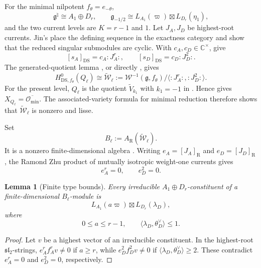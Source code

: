 \documentclass[11pt]{amsart}
\newtheorem{lemma}[theorem]{Lemma}
\theoremstyle{remark}
\numberwithin{equation}{section}
\begin{document}
For the minimal nilpotent \(f_\theta=e_{-\theta}\),
\[
   \mathfrak g^\natural\cong A_1\oplus D_r,
   \qquad
   \mathfrak g_{-1/2}
   \cong L_{A_1}(\varpi)\boxtimes L_{D_r}(\eta_1),
\]
and the two current levels are \(K=r-1\) and \(1\).  Let \(J_A,J_D\)
be highest-root currents.  Jin's \cite[Lemma~3.7 and Equation~(37)]{Jin2026}
place the defining sequence in the exactness category and show that the reduced
singular submodules are cyclic.  With \(c_A,c_D\in\mathbb C^\times\),
\cite[Lemma~3.3 and Proposition~3.6]{Jin2026} give
\[
   [s_A]_{\mathrm{DS}}=c_A:J_A^r:,
   \qquad
   [s_D]_{\mathrm{DS}}=c_D:J_D^2:.
\]
The generated-quotient lemma \cite[Proposition~2.3]{Jin2026}, or directly
\cite[Proposition~3.8]{Jin2026}, gives
\begin{equation}
\label{eq:exact-DS-Q}
   H^0_{\mathrm{DS},f_\theta}(Q_\ell)
   \cong
   \widetilde{\mathcal W}_\ell
   :=\mathcal W^{-1}(\mathfrak g,f_\theta)/
     \langle:J_A^r:,:J_D^2:\rangle.
\end{equation}
For the present level, \(Q_\ell\) is the quotient \(\widetilde V_{k_1}\)
with \(k_1=-1\) in \cite[Section~5]{ArakawaMoreau2018}.  Hence
\cite[Proposition~5.2]{ArakawaMoreau2018} gives
\(X_{Q_\ell}=\overline{\mathcal O_{\min}}\).  The associated-variety
formula for minimal reduction therefore shows that
\(\widetilde{\mathcal W}_\ell\) is nonzero and lisse.

Set
\[
   B_\ell:=A_{\mathrm R}(\widetilde{\mathcal W}_\ell).
\]
It is a nonzero finite-dimensional algebra
\cite[Section~3.3.1]{Jin2026}.  Writing
\(e_A=[J_A]_{\mathrm R}\) and \(e_D=[J_D]_{\mathrm R}\), the Ramond Zhu
product of mutually isotropic weight-one currents gives
\begin{equation}
   e_A^r=0,
   \qquad
   e_D^2=0.
\end{equation}

\begin{lemma}[Finite type bounds]
\label{lem:allowed-finite-types}
Every irreducible \(A_1\oplus D_r\)-constituent of a finite-dimensional
\(B_\ell\)-module is
\[
   L_{A_1}(a\varpi)\boxtimes L_{D_r}(\lambda_D),
\]
where
\begin{equation}
   0\le a\le r-1,
   \qquad
   \langle\lambda_D,\theta_D^\vee\rangle\le1.
\end{equation}
\end{lemma}

\begin{proof}
Let \(v\) be a highest vector of an irreducible constituent.  In the
highest-root \(\mathfrak{sl}_2\)-strings,
\(e_A^r f_A^r v\ne0\) if \(a\ge r\), while
\(e_D^2 f_D^2 v\ne0\) if
\(\langle\lambda_D,\theta_D^\vee\rangle\ge2\).  These contradict
\(e_A^r=0\) and \(e_D^2=0\), respectively.
\end{proof}
\end{document}
